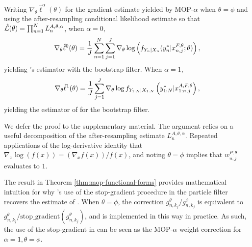 \documentclass[9pt,twocolumn,pnasresearcharticle]{pnas-new}
\newcommand\arxiv[2]{#2} %
\begin{document}
\begin{thm}
    \label{thm:mop-functional-forms}
    Writing $\nabla_\theta \hat\ell^\alpha(\theta)$ for the gradient estimate yielded by MOP-$\alpha$ when $\theta=\phi$ and using the after-resampling conditional likelihood estimate so that $\hat{\mathcal{L}}(\theta) = \prod_{n=1}^N L_n^{A, \theta, \alpha}$, when $\alpha=0$,
    \vspace*{-2.5mm}
    \begin{equation} \nonumber
        \nabla_\theta \hat\ell^0(\theta) 
        = \frac{1}{J} \sum_{n=1}^N \sum_{j=1}^J \nabla_\theta \log\left(f_{Y_n|X_{n}}(y_n^*|x_{n,j}^{F, \theta}; \theta)\right),
        \vspace*{-2.5mm}
    \end{equation}
    yielding \cite{naesseth18}'s estimator with the bootstrap filter. When $\alpha=1$,
    \vspace*{-2.5mm}
    \begin{equation} \nonumber
        \nabla_\theta \hat{\ell}^1(\theta) 
        = \frac{1}{J}\sum_{j=1}^J \nabla_\theta \log f_{Y_{1:N}|X_{1:N}}\left(y_{1:N}^* | x_{1:n,j}^{A, F,\theta}\right),
    \vspace*{-2.5mm}
    \end{equation}
    yielding the estimator of \cite{poyiadjis11, scibior21} for the bootstrap filter.
\end{thm}

We defer the proof to \arxiv{Appendix~\ref{appendix:functional}}{the supplementary material}. 
The argument relies on a useful decomposition of the after-resampling estimate $L_n^{A,\theta,\alpha}$. 
Repeated applications of the log-derivative identity that $\nabla_x \log(f(x)) = (\nabla_x f(x))/f(x)$, and noting $\theta=\phi$ implies that $w_{n,j}^{P,\theta}$ evaluates to $1$. 

The result in Theorem \ref{thm:mop-functional-forms} provides mathematical intuition for why \cite{scibior21}'s use of the stop-gradient procedure in the particle filter recovers the estimate of \cite{poyiadjis11}. When $\theta=\phi$, the correction $g_{n,k_j}^\theta/g_{n,k_j}^\phi$ is equivalent to $g_{n,k_j}^\theta / \text{stop\_gradient}(g_{n,k_j}^\theta)$, and is implemented in this way in practice. As such, the use of the stop-gradient in \cite{scibior21} can be seen as the MOP-$\alpha$ weight correction for $\alpha=1, \theta=\phi$.

\end{document}

